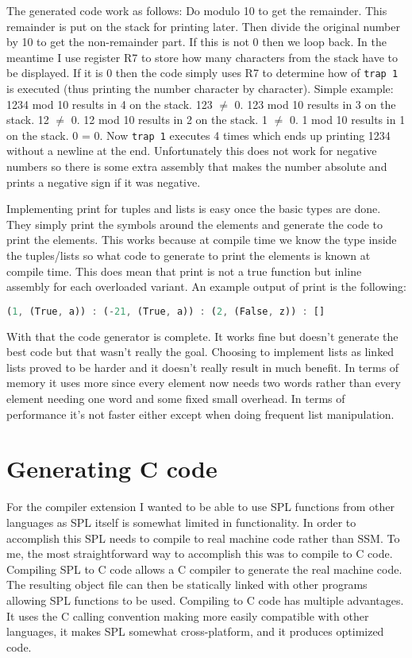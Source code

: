 \documentclass{article}
\begin{document}
The generated code work as follows: Do modulo 10 to get the remainder. This remainder is put on the stack for printing later. Then divide the original number by 10 to get the non-remainder part. If this is not 0 then we loop back. In the meantime I use register R7 to store how many characters from the stack have to be displayed. If it is 0 then the code simply uses R7 to determine how of \texttt{trap 1} is executed (thus printing the number character by character). Simple example: 1234 mod 10 results in 4 on the stack. 123 $\neq$ 0. 123 mod 10 results in 3 on the stack. 12 $\neq$ 0. 12 mod 10 results in 2 on the stack. 1 $\neq$ 0. 1 mod 10 results in 1 on the stack. 0 = 0. Now \texttt{trap 1} executes 4 times which ends up printing 1234 without a newline at the end. Unfortunately this does not work for negative numbers so there is some extra assembly that makes the number absolute and prints a negative sign if it was negative.

Implementing print for tuples and lists is easy once the basic types are done. They simply print the symbols around the elements and generate the code to print the elements. This works because at compile time we know the type inside the tuples/lists so what code to generate to print the elements is known at compile time. This does mean that print is not a true function but inline assembly for each overloaded variant. An example output of print is the following:
\begin{lstlisting}[language=Rust, style=boxed]
(1, (True, a)) : (-21, (True, a)) : (2, (False, z)) : []
\end{lstlisting}

With that the code generator is complete. It works fine but doesn't generate the best code but that wasn't really the goal. Choosing to implement lists as linked lists proved to be harder and it doesn't really result in much benefit. In terms of memory it uses more since every element now needs two words rather than every element needing one word and some fixed small overhead. In terms of performance it's not faster either except when doing frequent list manipulation.

\section{Generating C code}
For the compiler extension I wanted to be able to use SPL functions from other languages as SPL itself is somewhat limited in functionality. In order to accomplish this SPL needs to compile to real machine code rather than SSM. To me, the most straightforward way to accomplish this was to compile to C code. Compiling SPL to C code allows a C compiler to generate the real machine code. The resulting object file can then be statically linked with other programs allowing SPL functions to be used. Compiling to C code has multiple advantages. It uses the C calling convention making more easily compatible with other languages, it makes SPL somewhat cross-platform, and it produces optimized code.
\end{document}
